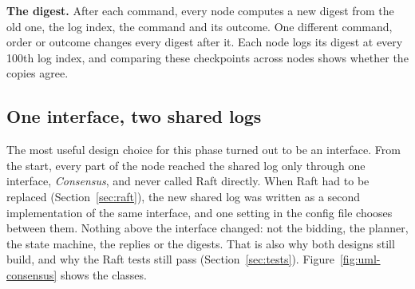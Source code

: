 \textbf{The digest.} After each command, every node computes a new digest from the old one, the log index, the command and its outcome. One different command, order or outcome changes every digest after it. Each node logs its digest at every 100th log index, and comparing these checkpoints across nodes shows whether the copies agree.

\subsection{One interface, two shared logs}
\label{sec:consensus-trait}

The most useful design choice for this phase turned out to be an interface. From the start, every part of the node reached the shared log only through one interface, \emph{Consensus}, and never called Raft directly. When Raft had to be replaced (Section~\ref{sec:raft}), the new shared log was written as a second implementation of the same interface, and one setting in the config file chooses between them. Nothing above the interface changed: not the bidding, the planner, the state machine, the replies or the digests. That is also why both designs still build, and why the Raft tests still pass (Section~\ref{sec:tests}). Figure~\ref{fig:uml-consensus} shows the classes.

